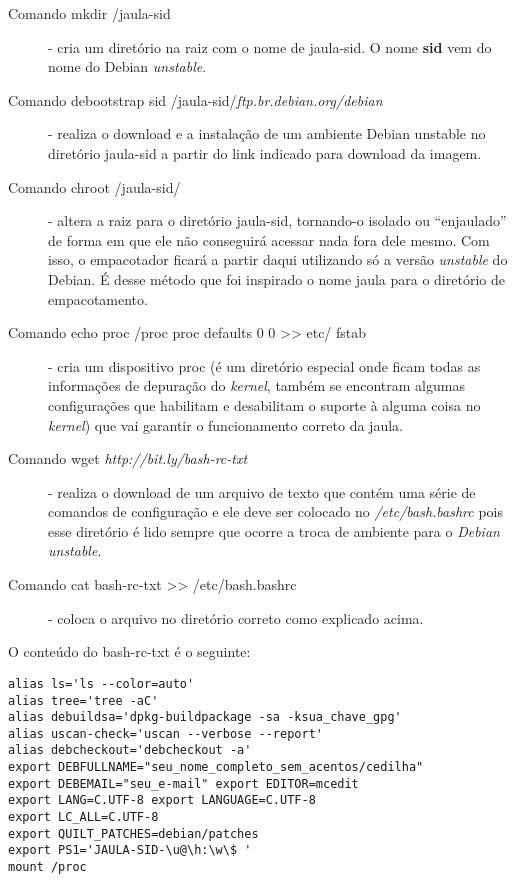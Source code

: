 \begin{description}

	\item[Comando mkdir /jaula-sid] - cria um diretório na raiz com o nome de jaula-sid. O nome \textbf{sid} vem do nome do Debian \textit{unstable}.
	\item[Comando debootstrap sid /jaula-sid/\textit{ftp.br.debian.org/debian}] - realiza o download e a instalação de um ambiente Debian unstable no diretório jaula-sid a partir do link indicado para download da imagem.
	\item[Comando chroot /jaula-sid/] - altera a raiz para o diretório jaula-sid, tornando-o isolado ou ``enjaulado'' de forma em que ele não conseguirá acessar nada fora dele mesmo. Com isso, o empacotador ficará a partir daqui utilizando só a versão \textit{unstable} do Debian. É desse método que foi inspirado o nome jaula para o diretório de empacotamento.
	\item[Comando echo proc /proc proc defaults 0 0 >> etc/ fstab] - cria um dispositivo proc (é um diretório especial onde ficam todas as informações de depuração do \textit{kernel}, também se encontram algumas configurações que habilitam e desabilitam o suporte à alguma coisa no \textit{kernel}) que vai garantir o funcionamento correto da jaula.
	\item[Comando wget \textit{http://bit.ly/bash-rc-txt}] - realiza o download de um arquivo de texto que contém uma série de comandos de configuração e ele deve ser colocado no \textit{/etc/bash.bashrc} pois esse diretório é lido sempre que ocorre a troca de ambiente para o \textit{Debian unstable}.
	\item[Comando cat bash-rc-txt >> /etc/bash.bashrc] - coloca o arquivo no diretório correto como explicado acima.

\end{description}

O conteúdo do bash-rc-txt é o seguinte:
\begin{verbatim}
alias ls='ls --color=auto' 
alias tree='tree -aC' 
alias debuildsa='dpkg-buildpackage -sa -ksua_chave_gpg' 
alias uscan-check='uscan --verbose --report' 
alias debcheckout='debcheckout -a' 
export DEBFULLNAME="seu_nome_completo_sem_acentos/cedilha" 
export DEBEMAIL="seu_e-mail" export EDITOR=mcedit 
export LANG=C.UTF-8 export LANGUAGE=C.UTF-8 
export LC_ALL=C.UTF-8 
export QUILT_PATCHES=debian/patches 
export PS1='JAULA-SID-\u@\h:\w\$ ' 
mount /proc 
\end{verbatim}

